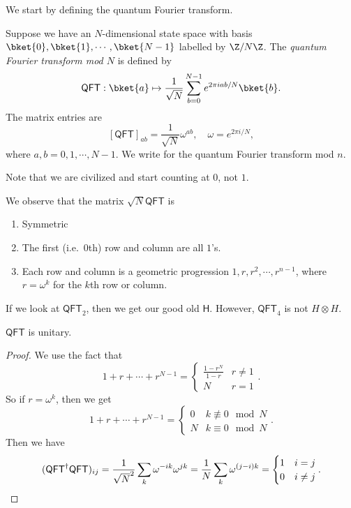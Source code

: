 \documentclass[a4paper]{article}
\newcommand{\qQFT}{\mathsf{QFT}}
\newcommand{\qH}{\mathsf{H}}
\begin{document}
We start by defining the quantum Fourier transform.
\begin{defi}
  Suppose we have an $N$-dimensional state space with basis $\bket{0}, \bket{1}, \cdots, \bket{N - 1}$ labelled by $\Z/N\Z$. The \emph{quantum Fourier transform mod $N$} is defined by
  \[
    \qQFT: \bket{a} \mapsto \frac{1}{\sqrt{N}} \sum_{b = 0}^{N - 1} e^{2\pi i ab/N} \bket{b}.
  \]
  The matrix entries are
  \[
    [\qQFT]_{ab} = \frac{1}{\sqrt{N}} \omega^{ab},\quad \omega = e^{2\pi i/N},
  \]
  where $a, b = 0, 1, \cdots, N - 1$. We write \term{$\qQFT_n$} for the quantum Fourier transform mod $n$.
\end{defi}
Note that we are civilized and start counting at $0$, not $1$.

We observe that the matrix $\sqrt{N}\qQFT$ is
\begin{enumerate}
  \item Symmetric
  \item The first (i.e.\ $0$th) row and column are all $1$'s.
  \item Each row and column is a geometric progression $1, r, r^2, \cdots, r^{n - 1}$, where $r = \omega^k$ for the $k$th row or column.
\end{enumerate}

\begin{eg}
  If we look at $\qQFT_2$, then we get our good old $\qH$. However, $\qQFT_4$ is not $H \otimes H$.
\end{eg}

\begin{prop}
  $\qQFT$ is unitary.
\end{prop}

\begin{proof}
  We use the fact that
  \[
    1 + r + \cdots + r^{N - 1} =
    \begin{cases}
      \frac{1 - r^N}{1 - r} & r \not= 1\\
      N & r = 1
    \end{cases}.
  \]
  So if $r = \omega^k$, then we get
  \[
    1 + r + \cdots + r^{N - 1} =
    \begin{cases}
      0 & k \not\equiv 0 \mod N\\
      N & k \equiv 0 \mod N
    \end{cases}.
  \]
  Then we have
  \[
    (\qQFT^\dagger \qQFT)_{ij} = \frac{1}{\sqrt{N}^2} \sum_k \omega^{-ik} \omega^{jk} =\frac{1}{N} \sum_k \omega^{(j-i)k} =
    \begin{cases}
      1 & i = j\\
      0 & i \not= j
    \end{cases}.\qedhere
  \]
\end{proof}
\end{document}
